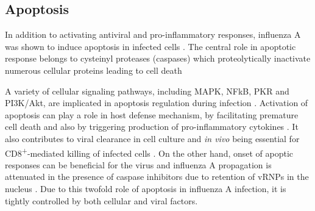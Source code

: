 	\subsection{Apoptosis}
		
	In addition to activating antiviral and pro-inflammatory responses, influenza A was shown to induce apoptosis in infected cells \parencite{Fesq1994, Hinshaw1994, Mori1995, Brydon2005}. The central role in apoptotic response belongs to cysteinyl proteases (caspases) which proteolytically inactivate numerous cellular proteins leading to cell death \parencite{Cohen1997, Thornberry1998}	
		
	A variety of cellular signaling pathways, including \gls{MAPK}, \gls{NFkB}, \gls{PKR} and \gls{PI3K}/Akt, are implicated in apoptosis regulation during infection \parencite{Gil2000, Xing2010, Lu2010}. Activation of apoptosis can play a role in host defense mechanism, by facilitating premature cell death and also by triggering production of pro-inflammatory cytokines \parencite{Julkunen2000}. It also contributes to viral clearance in cell culture and \textit{in vivo} being essential for CD8\textsuperscript{+}-mediated killing of infected cells \parencite{Ishikawa2005, Brincks2008}. On the other hand, onset of apoptic responses can be beneficial for the virus and influenza A propagation is attenuated in the presence of caspase inhibitors due to retention of \glspl{vRNP} in the nucleus \parencite{Wurzer2003}. Due to this twofold role of apoptosis in influenza A infection, it is tightly controlled by both cellular and viral factors.
			
		

